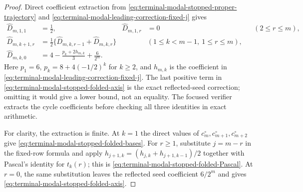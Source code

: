 \begin{proof}
Direct coefficient extraction from
\eqref{eq:terminal-modal-stopped-proper-trajectory} and
\eqref{eq:terminal-modal-leading-correction-fixed-j} gives
\begin{align}
 \widehat D_{m,1,1}&=\frac12,&
 \widehat D_{m,1,r}&=0 &&(2\le r\le m),
 \label{eq:terminal-modal-stopped-folded-bases}\\
 \widehat D_{m,k+1,r}
 &=\frac12\{\widehat D_{m,k,r-1}+\widehat D_{m,k,r}\}
 &&(1\le k<m-1,\ 1\le r\le m),
 \label{eq:terminal-modal-stopped-folded-Pascal}\\
 \widehat D_{m,k,0}
 &=4-\frac{p_k+2h_{m,k}}3+\frac6{2^m}.
 \label{eq:terminal-modal-stopped-folded-axis}
\end{align}
Here $p_1=6$, $p_k=8+4(-1/2)^k$ for $k\ge2$, and $h_{m,k}$ is the
coefficient in \eqref{eq:terminal-modal-leading-correction-fixed-j}.  The
last positive term in \eqref{eq:terminal-modal-stopped-folded-axis} is the
exact reflected-seed correction; omitting it would give a lower bound, not
an equality.  The focused verifier extracts the cycle coefficients before
checking all three identities in exact arithmetic.

For clarity, the extraction is finite.  At $k=1$ the direct values of
$c_m^\circ,c_{m+1}^\circ,c_{m+2}^\circ$ give
\eqref{eq:terminal-modal-stopped-folded-bases}.  For $r\ge1$, substitute
$j=m-r$ in the fixed-row formula and apply
$h_{j+1,k}=(h_{j,k}+h_{j+1,k-1})/2$ together with Pascal's identity for
$t_k(r)$; this is \eqref{eq:terminal-modal-stopped-folded-Pascal}.  At
$r=0$, the same substitution leaves the reflected seed coefficient
$6/2^m$ and gives \eqref{eq:terminal-modal-stopped-folded-axis}.


\end{proof}
